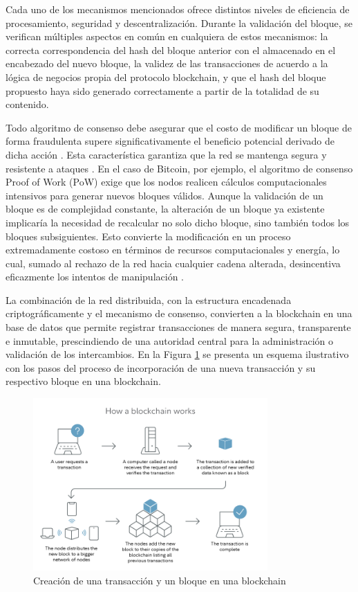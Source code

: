 Cada uno de los mecanismos mencionados ofrece distintos niveles de eficiencia de procesamiento, seguridad y descentralización. Durante la validación del bloque, se verifican múltiples aspectos en común en cualquiera de estos mecanismos: la correcta correspondencia del hash del bloque anterior con el almacenado en el encabezado del nuevo bloque, la validez de las transacciones de acuerdo a la lógica de negocios propia del protocolo blockchain, y que el hash del bloque propuesto haya sido generado correctamente a partir de la totalidad de su contenido.

Todo algoritmo de consenso debe asegurar que el costo de modificar un bloque de forma fraudulenta supere significativamente el beneficio potencial derivado de dicha acción \cite{satoshi2008bitcoin}. Esta característica garantiza que la red se mantenga segura y resistente a ataques \cite{buterin2013ethereum}. En el caso de Bitcoin, por ejemplo, el algoritmo de consenso Proof of Work (PoW) exige que los nodos realicen cálculos computacionales intensivos para generar nuevos bloques válidos. Aunque la validación de un bloque es de complejidad constante, la alteración de un bloque ya existente implicaría la necesidad de recalcular no solo dicho bloque, sino también todos los bloques subsiguientes. Esto convierte la modificación en un proceso extremadamente costoso en términos de recursos computacionales y energía, lo cual, sumado al rechazo de la red hacia cualquier cadena alterada, desincentiva eficazmente los intentos de manipulación \cite{satoshi2008bitcoin}.

La combinación de la red distribuida, con la estructura encadenada criptográficamente y el mecanismo de consenso, convierten a la blockchain en una base de datos que permite registrar transacciones de manera segura, transparente e inmutable, prescindiendo de una autoridad central para la administración o validación de los intercambios. En la Figura \ref{fig:blockchain-working} se presenta un esquema ilustrativo con los pasos del proceso de incorporación de una nueva transacción y su respectivo bloque en una blockchain. 

\begin{figure}[!htpb]
    \centering
    \includegraphics[width=0.8\textwidth]{Figures/block-creation.png}
    \caption{Creación de una transacción y un bloque en una blockchain}
    \label{fig:blockchain-working}
\end{figure}


